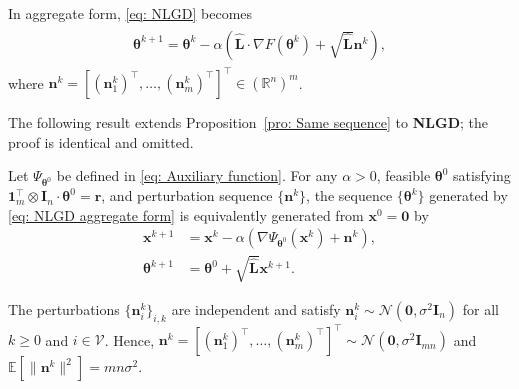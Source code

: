 \documentclass{siamart251216}
\begin{document}
In aggregate form, \eqref{eq: NLGD} becomes
\begin{gather}
\label{eq: NLGD aggregate form}
    \begin{gathered}
       \boldsymbol{\theta}^{k+1} = \boldsymbol{\theta}^{k} - \alpha (\hat{\mathbf{L}} \cdot\nabla  F(\boldsymbol{\theta}^{k}) + \sqrt{\hat{\mathbf{L}}}\mathbf{n}^{k}),    
    \end{gathered}
\end{gather}
where $\mathbf{n}^{k}=[(\mathbf{n}_{1}^{k})^{\top},\ldots,(\mathbf{n}_{m}^{k})^{\top}]^{\top}\in(\mathbb{R}^{n})^{m}$.

The following result extends Proposition~\ref{pro: Same sequence} to \textbf{NLGD}; the proof is identical and omitted.
\begin{proposition}
\label{pro: NGD interpretation}
Let $\Psi_{\boldsymbol{\theta}^{0}}$ be defined in \eqref{eq: Auxiliary function}. For any $\alpha>0$, feasible $\boldsymbol{\theta}^{0}$ satisfying $\bm{1}_{m}^{\top}\otimes\mathbf{I}_{n}\cdot\boldsymbol{\theta}^{0}=\mathbf{r}$, and perturbation sequence $\{\mathbf{n}^{k}\}$, the sequence $\{\boldsymbol{\theta}^{k}\}$ generated by \eqref{eq: NLGD aggregate form} is equivalently generated from $\mathbf{x}^{0}=\bm{0}$ by
\begin{subequations}
\label{eq: NLGD with auxiliary function}
\begin{align}
\mathbf{x}^{k+1}&=\mathbf{x}^{k}-\alpha\left(\nabla\Psi_{\boldsymbol{\theta}^{0}}(\mathbf{x}^{k})+\mathbf{n}^{k}\right), \label{eq: NLGD with auxiliary function 1}\\
\boldsymbol{\theta}^{k+1}&=\boldsymbol{\theta}^{0}+\sqrt{\hat{\mathbf{L}}}\mathbf{x}^{k+1}. \label{eq: NLGD with auxiliary function 2}
\end{align}
\end{subequations}
\end{proposition}

\begin{assumption}
\label{ass: Random perturbation}
The perturbations $\{\mathbf{n}_{i}^{k}\}_{i,k}$ are independent and satisfy $\mathbf{n}_{i}^{k}\sim\mathcal{N}(\bm{0},\sigma^{2}\mathbf{I}_{n})$ for all $k\geq0$ and $i\in\mathcal{V}$. Hence, $\mathbf{n}^{k}=[(\mathbf{n}_{1}^{k})^{\top},\ldots,(\mathbf{n}_{m}^{k})^{\top}]^{\top}\sim\mathcal{N}(\bm{0},\sigma^{2}\mathbf{I}_{mn})$ and $\mathbb{E}[\|\mathbf{n}^{k}\|^{2}]=mn\sigma^{2}$.
\end{assumption}
\end{document}
